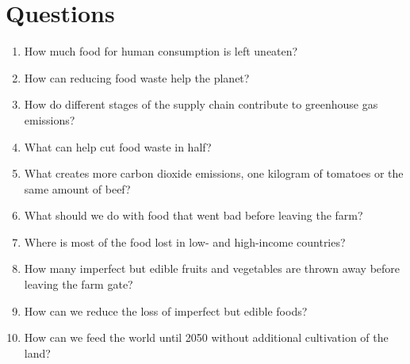 \documentclass[a4paper]{article}
\begin{document}
\section*{Questions}
\begin{enumerate}
\item How much food for human consumption is left uneaten?
\item How can reducing food waste help the planet?
\item How do different stages of the supply chain contribute to greenhouse gas emissions?
\item What can help cut food waste in half?
\item What creates more carbon dioxide emissions, one kilogram of tomatoes or the same amount of beef?
\item What should we do with food that went bad before leaving the farm?
\item Where is most of the food lost in low- and high-income countries?
\item How many imperfect but edible fruits and vegetables are thrown away before leaving the farm gate?
\item How can we reduce the loss of imperfect but edible foods?
\item How can we feed the world until 2050 without additional cultivation of the land?
\end{enumerate}
\end{document}
